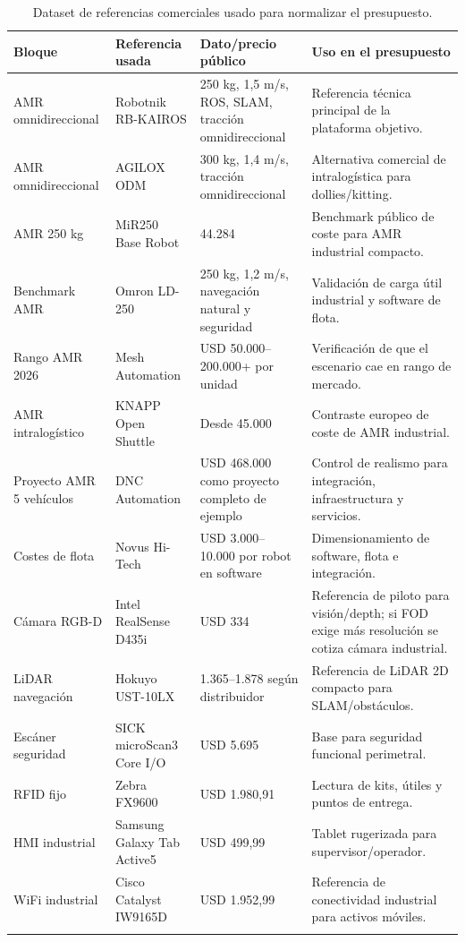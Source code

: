 \begin{longtable}{P{0.23\textwidth}P{0.24\textwidth}P{0.18\textwidth}P{0.25\textwidth}}
\toprule
Bloque & Referencia usada & Dato/precio público & Uso en el presupuesto\\
\midrule
\endhead
AMR omnidireccional & Robotnik RB-KAIROS & 250 kg, 1,5 m/s, ROS, SLAM, tracción omnidireccional & Referencia técnica principal de la plataforma objetivo.\\
AMR omnidireccional & AGILOX ODM & 300 kg, 1,4 m/s, tracción omnidireccional & Alternativa comercial de intralogística para dollies/kitting.\\
AMR 250 kg & MiR250 Base Robot & 44.284 \texteuro{} & Benchmark público de coste para AMR industrial compacto.\\
Benchmark AMR & Omron LD-250 & 250 kg, 1,2 m/s, navegación natural y seguridad & Validación de carga útil industrial y software de flota.\\
Rango AMR 2026 & Mesh Automation & USD 50.000--200.000+ por unidad & Verificación de que el escenario cae en rango de mercado.\\
AMR intralogístico & KNAPP Open Shuttle & Desde 45.000 \texteuro{} & Contraste europeo de coste de AMR industrial.\\
Proyecto AMR 5 vehículos & DNC Automation & USD 468.000 como proyecto completo de ejemplo & Control de realismo para integración, infraestructura y servicios.\\
Costes de flota & Novus Hi-Tech & USD 3.000--10.000 por robot en software & Dimensionamiento de software, flota e integración.\\
Cámara RGB-D & Intel RealSense D435i & USD 334 & Referencia de piloto para visión/depth; si FOD exige más resolución se cotiza cámara industrial.\\
LiDAR navegación & Hokuyo UST-10LX & 1.365--1.878 \texteuro{} según distribuidor & Referencia de LiDAR 2D compacto para SLAM/obstáculos.\\
Escáner seguridad & SICK microScan3 Core I/O & USD 5.695 & Base para seguridad funcional perimetral.\\
RFID fijo & Zebra FX9600 & USD 1.980,91 & Lectura de kits, útiles y puntos de entrega.\\
HMI industrial & Samsung Galaxy Tab Active5 & USD 499,99 & Tablet rugerizada para supervisor/operador.\\
WiFi industrial & Cisco Catalyst IW9165D & USD 1.952,99 & Referencia de conectividad industrial para activos móviles.\\
\bottomrule
\caption{Dataset de referencias comerciales usado para normalizar el presupuesto.}
\label{tab:referencias-comerciales}
\end{longtable}


